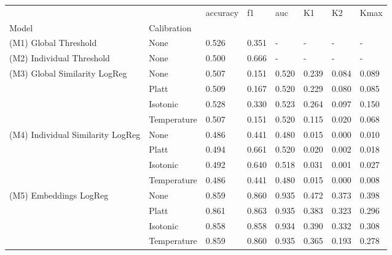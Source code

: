 \begin{tabular}{llllllll}
\toprule
 &  & accuracy & f1 & auc & K1 & K2 & Kmax \\
Model & Calibration &  &  &  &  &  &  \\
\midrule
(M1) Global Threshold & None & 0.526 & 0.351 & - & - & - & - \\
\cline{1-8}
(M2) Individual Threshold & None & 0.500 & 0.666 & - & - & - & - \\
\cline{1-8}
\multirow[t]{4}{*}{(M3) Global Similarity LogReg} & None & 0.507 & 0.151 & 0.520 & 0.239 & 0.084 & 0.089 \\
 & Platt & 0.509 & 0.167 & 0.520 & 0.229 & 0.080 & 0.085 \\
 & Isotonic & 0.528 & 0.330 & 0.523 & 0.264 & 0.097 & 0.150 \\
 & Temperature & 0.507 & 0.151 & 0.520 & 0.115 & 0.020 & 0.068 \\
\cline{1-8}
\multirow[t]{4}{*}{(M4) Individual Similarity LogReg} & None & 0.486 & 0.441 & 0.480 & 0.015 & 0.000 & 0.010 \\
 & Platt & 0.494 & 0.661 & 0.520 & 0.020 & 0.002 & 0.018 \\
 & Isotonic & 0.492 & 0.640 & 0.518 & 0.031 & 0.001 & 0.027 \\
 & Temperature & 0.486 & 0.441 & 0.480 & 0.015 & 0.000 & 0.008 \\
\cline{1-8}
\multirow[t]{4}{*}{(M5) Embeddings LogReg} & None & 0.859 & 0.860 & 0.935 & 0.472 & 0.373 & 0.398 \\
 & Platt & 0.861 & 0.863 & 0.935 & 0.383 & 0.323 & 0.296 \\
 & Isotonic & 0.858 & 0.858 & 0.934 & 0.390 & 0.332 & 0.308 \\
 & Temperature & 0.859 & 0.860 & 0.935 & 0.365 & 0.193 & 0.278 \\
\cline{1-8}
\bottomrule
\end{tabular}
